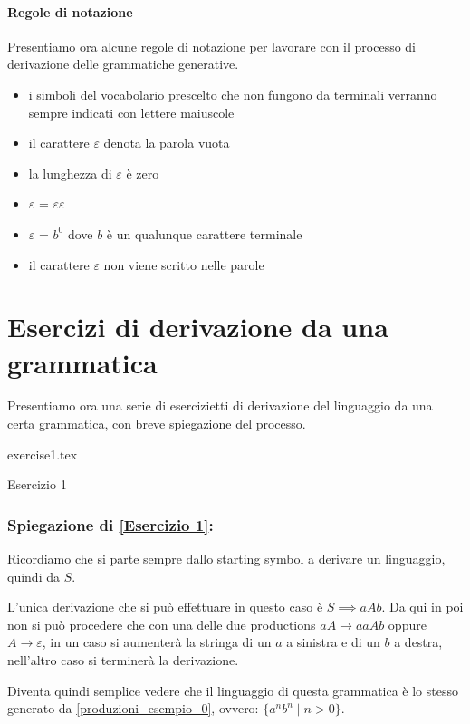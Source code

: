 \documentclass[class=book, crop=false, oneside, 12pt]{standalone}
\begin{document}
\paragraph{Regole di notazione}
Presentiamo ora alcune regole di notazione per lavorare con il processo di derivazione delle grammatiche generative.
\begin{itemize}
    \item i simboli del vocabolario prescelto che non fungono da terminali verranno sempre indicati con lettere maiuscole
    \item il carattere $\varepsilon$ denota la parola vuota
    \item la lunghezza di $\varepsilon$ è zero
    \item $\varepsilon$ = $\varepsilon$$\varepsilon$
    \item $\varepsilon$ =  $b^0$ dove $b$ è un qualunque carattere terminale
    \item il carattere $\varepsilon$ non viene scritto nelle parole
\end{itemize}

\section{Esercizi di derivazione da una grammatica}
Presentiamo ora una serie di esercizietti di derivazione del linguaggio da una certa grammatica, con breve spiegazione del processo.

\begin{table}[H]
	\centering
	{exercise1.tex}
    \caption{Esercizio 1}
    \label{Esercizio 1}
\end{table}
\subsubsection*{Spiegazione di \ref{Esercizio 1}:}
Ricordiamo che si parte sempre dallo starting symbol a derivare un linguaggio, quindi da $S$.

L'unica derivazione che si può effettuare in questo caso è $S \implies aAb$.
Da qui in poi non si può procedere che con una delle due productions $aA \to aaAb$ oppure $A \to \varepsilon$, in un caso si aumenterà la stringa di un $a$ a sinistra e di un $b$ a destra, nell'altro caso si terminerà la derivazione.

Diventa quindi semplice vedere che il linguaggio di questa grammatica è lo stesso generato da \ref{produzioni_esempio_0}, ovvero: $\{a^n b^n \mid n>0\}$.
\end{document}
